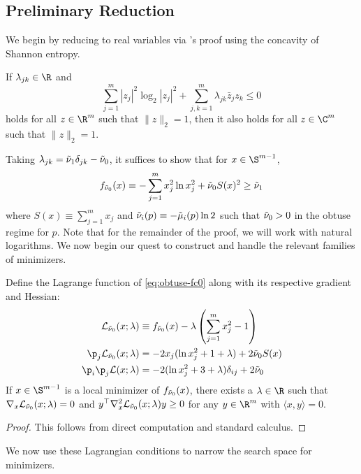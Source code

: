 \documentclass[11pt]{article}
\begin{document}
\subsection{Preliminary Reduction}
We begin by reducing to real variables via \citep{holevo2025quantum}'s proof using the concavity of Shannon entropy.  
\begin{lemma}\label{lemma:C-to-R}
If $\lambda_{jk}\in \R $ and 
\begin{equation}
    \sum_{j=1}^m |z_j|^2 \log_2 |z_j|^2 +\sum_{j,k=1}^m\lambda_{jk}\bar{z}_j z_k \leq 0
\end{equation}
holds for all $z\in \R^m  $ such that $\|z\|_2=1$, then it also holds for all $z\in \C^m $ such that $\|z\|_2=1$. 
\end{lemma}
Taking $\lambda_{jk}={\Tilde \nu_1}\delta_{jk}-{\Tilde \nu_0}$, it suffices to show that for $x\in \S^{m-1}$, 
\begin{equation}\label{eq:obtuse-fc0}
   f_{{\Tilde \nu_0}}(x)\equiv -\sum_{j=1}^m x_j^2 \ln x_j^2 +{\Tilde \nu_0}S(x)^2 \geq {\Tilde \nu_1} 
\end{equation}
where $S(x)\equiv \sum_{j=1}^m x_j$ and $\Tilde\nu_i(p)\equiv -\Tilde \mu_i(p)\ln 2 $ such that ${\Tilde \nu_0}>0$ in the obtuse regime for $p$. Note that for the remainder of the proof, we will work with natural logarithms. We now begin our quest to construct and handle the relevant families of minimizers.
\begin{lemma}\label{lemma:obtuse-lagrange}
    Define the Lagrange function of \eqref{eq:obtuse-fc0} along with its respective gradient and Hessian:
    \begin{equation}\label{eq:obtuse-lagrange}
    \begin{aligned}
         \mathcal L_{{\Tilde \nu_0}} (x;\lambda)&\equiv f_{{\Tilde \nu_0}} (x)-\lambda \left(\sum_{j=1}^m x_j^2 -1\right)\\
       \p_j \mathcal{L}_{{\Tilde \nu_0}}(x;\lambda)&=-2x_j(\ln x_j^2 + 1+\lambda)+2{\Tilde \nu_0}S(x)\\
        \p_i\p_j  \mathcal L (x;\lambda)&= -2(\ln x_j^2+3+\lambda)\delta_{ij}+2{\Tilde \nu_0} 
    \end{aligned}
    \end{equation}
    If $x\in \S^{m-1}$ is a local minimizer of $f_{{\Tilde \nu_0}}(x)$, there exists a $\lambda \in \R$ such that $\nabla_x\mathcal{L}_{{\Tilde \nu_0}}(x;\lambda)=0$ and $y^\top \nabla^2_x \mathcal{L}_{{\Tilde \nu_0}}(x;\lambda)y\geq 0$ for any $y\in \R^m$ with $\langle x,y\rangle=0$. 
\end{lemma}
\begin{proof}
    This follows from direct computation and standard calculus.
\end{proof}
We now use these Lagrangian conditions to narrow the search space for minimizers. 
\end{document}
